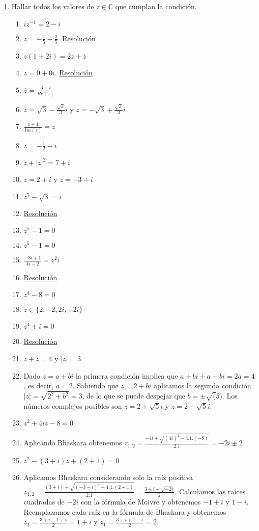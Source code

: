 \documentclass[a4paper]{article}
\newcommand{\answer}{\item[**]}
\newcommand{\exercise}{\item}
\newcommand{\df}[2]{\displaystyle\frac{#1}{#2}}
\newcommand{\conj}[1]{\overline{#1}}
\begin{document}
\begin{enumerate}
	\exercise Hallar todos los valores de $z \in \mathbb{C}$ que cumplan la condición.
	\begin{multicols}{2}
	\begin{enumerate} [label=(\alph*)]
		
		\item $iz^{-1}=2-i$
		\answer $z=-\df{1}{5}+\df{2}{5}$. \href{https://youtu.be/Yrh7otV4DzI}{Resolución}

		\item $z(1+2i)=2z+\conj{z}$
		\answer $z=0+0i$. \href{https://youtu.be/erb6iZXGQw4}{Resolución}

		\item $\conj{z}=\df{3+i}{Re(z)}$
		\answer $z=\sqrt{3}-\df{\sqrt{3}}{3}i$ y $z=-\sqrt{3}+\df{\sqrt{3}}{3}i$

		\item $\df{z+1}{Im(z)}=\conj{z}$
		\answer $z=-\df{1}{2}-i$

		\item $z+|z|^2=7+i$
		\answer $z=2+i$ y $z=-3+i$

		\item $z^5-\sqrt{3}=i$
		\answer \href{https://youtu.be/plpDsgzooH4}{Resolución}

		\item $z^5-1=0$
		\answer $z^5-1=0$

		\item $\df{-3i+1}{4i-2}=z^2i$
		\answer \href{https://youtu.be/8z_3vpIabLI}{Resolución}

		\item $z^4-8=0$
		\answer $z \in \{2,-2,2i,-2i\}$

		\item $z^4+i=0$
		\answer \href{https://youtu.be/7ggnxlrUnrk}{Resolución}

		\item $z+\conj{z}=4$ y $|z|=3$
		\answer Dado $z=a+bi$ la primera condición implica que $a+bi+a-bi=2a=4$, es decir, $a=2$. Sabiendo que $z=2+bi$ aplicamos la segunda condición $|z|=\sqrt{2^2+b^2}=3$, de lo que se puede despejar que $b=\pm\sqrt(5)$. Los números complejos posibles son $z=2+\sqrt{5}i$ y $z=2-\sqrt{5}i$.

		\item $z^2+4iz-8=0$
		\answer Aplicando Bhaskara obtenemos $z_{1,2}=\df{-4i\pm\sqrt{(4i)^2-4.1.(-8)}}{2.1}=-2i\pm2$

		\item $z^2-(3+i)z+(2+1)=0$
		\answer Aplicamos Bhaskara considerando solo la raíz positiva $z_{1,2}=\df{(3+i)+\sqrt{(-3-i)^2-4.1.(2+1)}}{2.1}=\df{3+i+\sqrt{-2i}}{2}$. Calculamos las raíces cuadradas de $-2i$ con la fórmula de Moivre y obtenemos $-1+i$ y $1-i$. Reemplazamos cada raíz en la fórmula de Bhaskara y obtenemos $z_1=\df{3+i-1+i}{2}=1+i$ y $z_1=\df{3+i+1-i}{2}=2$.


\end{enumerate}
\end{multicols}
\end{enumerate}
\end{document}
